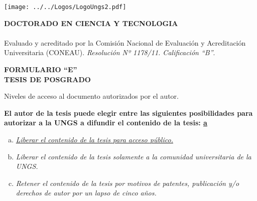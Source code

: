 
\begin{flushright}
	\texttt{[image: ../../Logos/LogoUngs2.pdf]}
\end{flushright}

	\begin{center}
		\textbf{DOCTORADO EN CIENCIA Y TECNOLOGIA}\vspace{-3mm}\\
		\hrulefill\\
		{\small {Evaluado y acreditado por la Comisión Nacional de Evaluación y Acreditación Universitaria (CONEAU). \emph{Resolución Nº 1178/11. Calificación “B”}.}}
	\end{center}
\vspace{2mm}
\begin{center}
	\textbf{FORMULARIO “E”} \\
	\textbf{TESIS DE POSGRADO}
\end{center}
\bigskip
\noindent Niveles de acceso al documento autorizados por el autor.

\textbf{El autor de la tesis puede elegir entre las siguientes posibilidades para autorizar  a la UNGS a difundir el contenido de la tesis: \underline{a}}
\begin{enumerate}[a)]
	\item \textit{\underline{Liberar el contenido de la tesis para acceso público.}}
	\item \textit{Liberar el contenido de la tesis solamente a la comunidad universitaria de la UNGS.}
	\item \textit{Retener el contenido de la tesis por motivos de patentes, publicación y/o derechos de autor por un lapso de cinco años.}
\end{enumerate}

